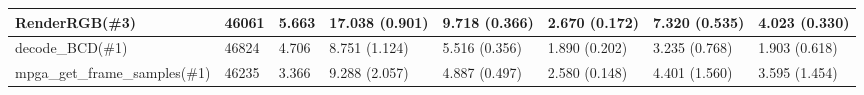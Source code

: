 \begin{table*}[]
\begin{tabular}{@{}llllllll@{}}
										\multicolumn{1}{l}{RenderRGB(\#3)} &
										\multicolumn{1}{l}{46061} &
										\multicolumn{1}{l}{5.663} &
										\multicolumn{1}{l}{17.038 (0.901)} &
										\multicolumn{1}{l}{9.718 (0.366)} &
										\multicolumn{1}{l}{2.670 (0.172)} &
										\multicolumn{1}{l}{7.320 (0.535)} &
										\multicolumn{1}{l}{4.023 (0.330)} \\ \midrule
										\multicolumn{1}{l}{decode\_BCD(\#1)} &
										\multicolumn{1}{l}{46824} &
										\multicolumn{1}{l}{4.706} &
										\multicolumn{1}{l}{8.751 (1.124)} &
										\multicolumn{1}{l}{5.516 (0.356)} &
										\multicolumn{1}{l}{1.890 (0.202)} &
										\multicolumn{1}{l}{3.235 (0.768)} &
										\multicolumn{1}{l}{1.903 (0.618)} \\ \midrule
										mpga\_get\_frame\_samples(\#1) & 46235 & 3.366 &
										9.288 (2.057) & 4.887 (0.497) & 2.580 (0.148) &
										4.401 (1.560) & 3.595 (1.454) \\ \bottomrule
									\end{tabular}
								\end{table*}
